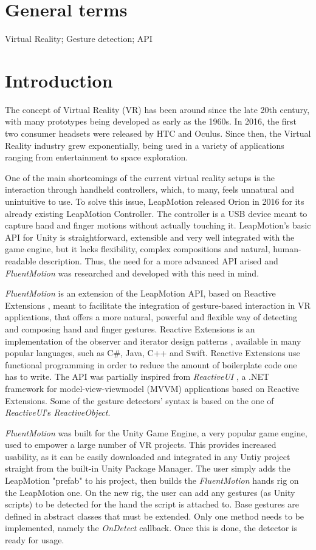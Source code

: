 \documentclass[chi_draft]{sigchi}
\def\fluentmotion{\textit{FluentMotion}}
\def\rx{Reactive Extensions}
\def\unity{Unity Game Engine}
\def\leap{LeapMotion}
\def\vr{Virtual Reality}
\def\reactiveui{\textit{ReactiveUI}}
\begin{document}
\section{General terms}
Virtual Reality; Gesture detection; API

\section{Introduction}
The concept of \vr{} (VR) has been around since the late 20th century, with many prototypes being developed as early as the 1960s. In 2016, the first two consumer headsets were released by HTC and Oculus. Since then, the \vr{} industry grew exponentially, being used in a variety of applications ranging from entertainment to space exploration.

One of the main shortcomings of the current virtual reality setups is the interaction through handheld controllers, which, to many, feels unnatural and unintuitive to use. To solve this issue, LeapMotion released Orion \cite{Orion} in 2016 for its already existing LeapMotion Controller. The controller is a USB device meant to capture hand and finger motions without actually touching it. \leap{}'s basic API for Unity is straightforward, extensible and very well integrated with the game engine, but it lacks flexibility, complex compositions and natural, human-readable description. Thus, the need for a more advanced API arised and \fluentmotion{} was researched and developed with this need in mind.

\fluentmotion{} is an extension of the \leap{} API, based on \rx{} \cite{rx}, meant to facilitate the integration of gesture-based interaction in VR applications, that offers a more natural, powerful and flexible way of detecting and composing hand and finger gestures. \rx{} is an implementation of the observer and iterator design patterns \cite{DPEROOS}, available in many popular languages, such as C\#, Java, C++ and Swift. \rx{} use functional programming in order to reduce the amount of boilerplate code one has to write. The API was partially inspired from \reactiveui{} \cite{ReactiveUI}, a .NET framework for model-view-viewmodel (MVVM) applications based on \rx{}. Some of the gesture detectors' syntax is based on the one of \reactiveui{}'s \textit{ReactiveObject}.

\fluentmotion{} was built for the \unity{}, a very popular game engine, used to empower a large number of VR projects. This provides increased usability, as it can be easily downloaded and integrated in any Untiy project straight from the built-in Unity Package Manager. The user simply adds the \leap{} "prefab" to his project, then builds the \fluentmotion{} hands rig on the \leap{} one. On the new rig, the user can add any gestures (as Unity scripts) to be detected for the hand the script is attached to. Base gestures are defined in abstract classes that must be extended. Only one method needs to be implemented, namely the \textit{OnDetect} callback. Once this is done, the detector is ready for usage.
\end{document}
